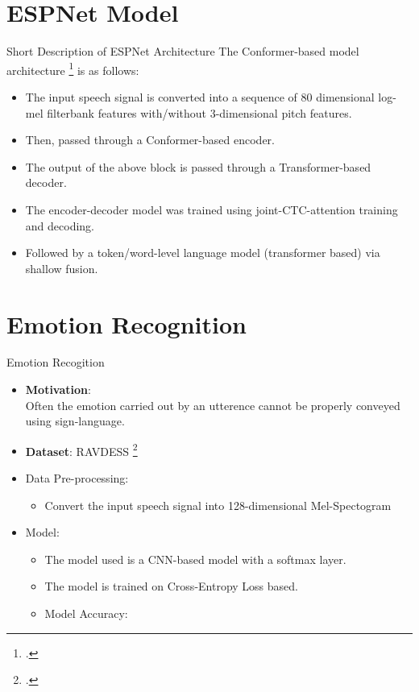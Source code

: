 \documentclass[10pt]{beamer}
\begin{document}
\section{ESPNet Model}
\begin{frame}{Short Description of ESPNet Architecture }
The Conformer-based model architecture \footcite{espnet} is as follows:
\begin{itemize}
	\item The input speech signal is converted into a sequence of 80 dimensional log-mel filterbank features with/without 3-dimensional pitch features.
	\item Then, passed through a Conformer-based encoder.
	\item The output of the above block is passed through a Transformer-based decoder.
	\item The encoder-decoder model was trained using joint-CTC-attention training and decoding.
	\item Followed by a token/word-level language model (transformer based) via shallow fusion.
\end{itemize}
\end{frame}

\section{Emotion Recognition}
\begin{frame}{Emotion Recogition}
\begin{itemize}
	\item \textbf{Motivation}:\\
	Often the emotion carried out by an utterence cannot be properly conveyed using sign-language.
	\item \textbf{Dataset}: RAVDESS \footcite{ravdess}
	\item Data Pre-processing:
	\begin{itemize}
		\item Convert the input speech signal into 128-dimensional Mel-Spectogram
	\end{itemize}
	\item Model:
	\begin{itemize}
		\item The model used is a CNN-based model with a softmax layer.
		\item The model is trained on Cross-Entropy Loss based.
		\item Model Accuracy: 
	\end{itemize}
\end{itemize}
\end{frame}
\end{document}
